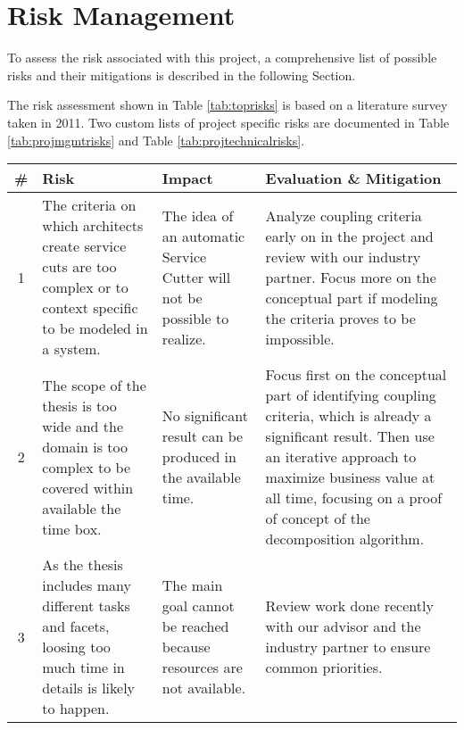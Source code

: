 \section{Risk Management}


To assess the risk associated with this project, a comprehensive list of possible risks and their mitigations is described in the following Section. 

The risk assessment shown in Table \ref{tab:toprisks} is based on a literature survey\cite{arnuphaptrairong2011top} taken in 2011. Two custom lists of project specific risks are documented in Table \ref{tab:projmgmtrisks} and Table \ref{tab:projtechnicalrisks}.

\begin{table}[H]
\begin{tabular}{|c|p{120pt} p{100pt} p{140pt}|}
\hline \# & Risk & Impact & Evaluation \& Mitigation \\ 
\hline 1 & The criteria on which architects create service cuts are too complex or to context specific to be modeled in a system. & The idea of an automatic Service Cutter will not be possible to realize. & Analyze coupling criteria early on in the project and review with our industry partner. Focus more on the conceptual part if modeling the criteria proves to be impossible. \\
2 & The scope of the thesis is too wide and the domain is too complex to be covered within available the time box. & No significant result can be produced in the available time. & Focus first on the conceptual part of identifying coupling criteria, which is already a significant result. Then use an iterative approach to maximize business value at all time, focusing on a proof of concept of the decomposition algorithm. \\
3 & As the thesis includes many different tasks and facets, loosing too much time in details is likely to happen. & The main goal cannot be reached because resources are not available. & Review work done recently with our advisor and the industry partner to ensure common priorities. \\

\end{tabular}
\end{table}
